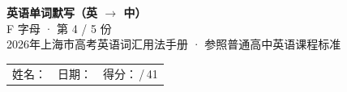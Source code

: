 \documentclass[10pt,a4paper]{article}
\begin{document}
\pagestyle{plain}

\begin{center}
{\LARGE\bfseries 英语单词默写（英 $\to$ 中）}\\[0.22em]
{\large F 字母 · 第 4 / 5 份}\\[0.18em]
{\small 2026年上海市高考英语词汇用法手册 · 参照普通高中英语课程标准}
\end{center}

\vspace{0.25em}
\noindent\begin{tabular}{@{}p{}@{}p{}@{}p{}@{}}
姓名：\underline{\hspace{2.0cm}} & 日期：\underline{\hspace{2.0cm}} & 得分：\underline{\hspace{1.3cm}}\,/\,41 \\
\end{tabular}

\vspace{0.3em}

\vspace{0.08em}
\end{document}
